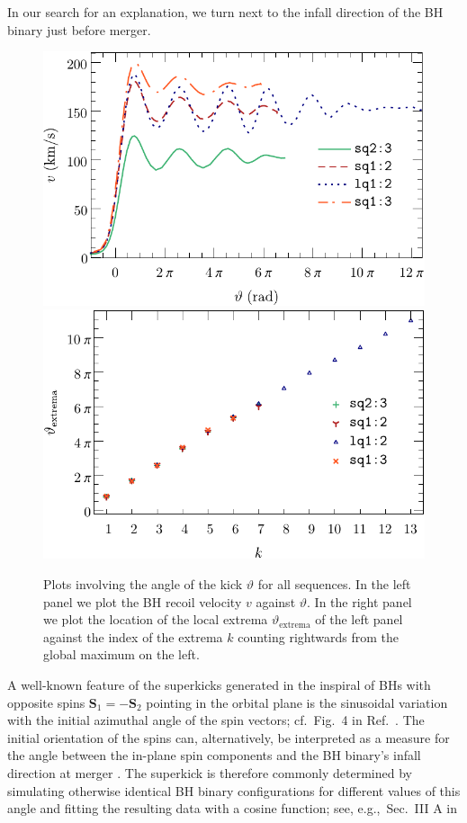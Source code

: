 In our search for an explanation, we turn next to the infall direction
of the BH binary just before merger.
%
%
\begin{figure}[t]
    \subfloat%
    {
    \includegraphics[width=0.5\columnwidth]{bhkick/kick-theta.pdf}
    \label{bhkick:fig:kick-theta}
    }
    \hfill
    \subfloat%
    {
    \includegraphics[width=0.5\columnwidth]{bhkick/theta-extrema.pdf}
    \label{bhkick:fig:theta-extrema}
    }
    \caption{
    Plots involving the angle of the kick $\vartheta$ for
    all sequences. In the left panel we plot the BH recoil
    velocity $v$ against $\vartheta$. In the right panel we plot the location of the local extrema $\vartheta_\text{extrema}$
    of the left panel against the index of the extrema $k$ counting rightwards from
    the global maximum on the left.
    }
    \label{bhkick:fig:theta-plots}
\end{figure}
%
A well-known feature of the superkicks generated in the inspiral
of BHs with opposite spins $\boldsymbol{S}_1=-\boldsymbol{S}_2$
pointing in the orbital
plane is the sinusoidal variation with the initial azimuthal angle
of the spin vectors; cf.~Fig.~4 in Ref.~\cite{Bruegmann:2007zj}.
The initial orientation of the spins can, alternatively, be
interpreted as a measure for the angle between the in-plane
spin components and the BH binary's infall direction at merger
\cite{Lousto:2009ka}. The superkick is therefore commonly
determined by simulating otherwise identical BH binary configurations
for different values of this angle and fitting the resulting data
with a cosine function; see, e.g.,~Sec.~III A in
